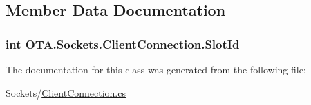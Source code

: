 \subsection{Member Data Documentation}
\hypertarget{class_o_t_a_1_1_sockets_1_1_client_connection_ad4c258a26c87be978e43c5f376322210}{}
\subsubsection[{Slot\+Id}]{\setlength{\rightskip}{0pt plus 5cm}int O\+T\+A.\+Sockets.\+Client\+Connection.\+Slot\+Id}\label{class_o_t_a_1_1_sockets_1_1_client_connection_ad4c258a26c87be978e43c5f376322210}


The documentation for this class was generated from the following file\+:\begin{DoxyCompactItemize}
\item 
Sockets/\hyperlink{_client_connection_8cs}{Client\+Connection.\+cs}\end{DoxyCompactItemize}
